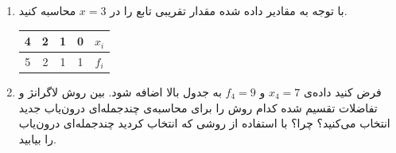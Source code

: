 \begin{enumerate}
\item

با توجه به مقادیر داده شده مقدار تقریبی تابع را در 
$x = 3$
محاسبه کنید.

	
	\begin{center}
		\begin{tabular}{c | c | c | c | c }
			4 & 2 & 1 & 0 & $x_i$ \\
			\hline
			5 & 2 & 1 & 1 & $f_i$ 
			
		\end{tabular}
\end{center}
	\item
	فرض کنید داده‌ی 
	$x_4 = 7$
	و 
	$f_4 = 9$
	به جدول بالا اضافه شود. بین روش لاگرانژ و تفاضلات تقسیم شده کدام روش را برای محاسبه‌ی چندجمله‌ای درون‌یاب جدید انتخاب می‌کنید؟ چرا؟ با استفاده از روشی که انتخاب کردید چندجمله‌ای درون‌یاب را بیابید.
\end{enumerate}
